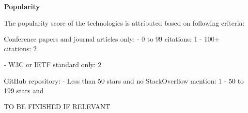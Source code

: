 \textbf{Popularity}

The popularity score of the technologies is attributed based on following criteria:

Conference papers and journal articles only:
- 0 to 99 citations: 1
- 100+ citations: 2

- W3C or IETF standard only: 2

GitHub repository:
- Less than 50 stars and no StackOverflow mention: 1
- 50 to 199 stars and 

TO BE FINISHED IF RELEVANT
